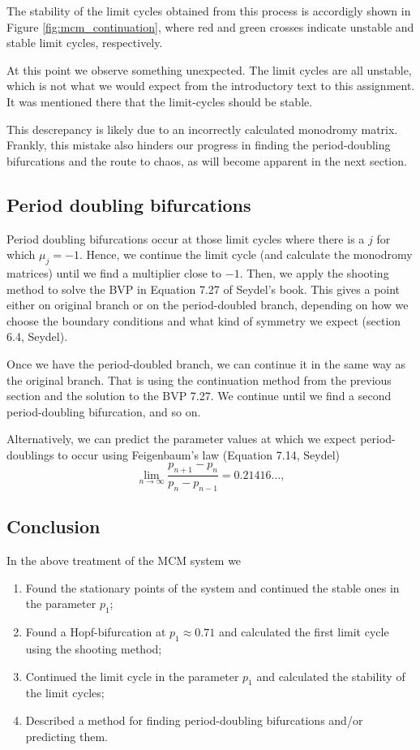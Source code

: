 The stability of the limit cycles obtained from this process is accordigly shown in Figure \ref{fig:mcm_continuation}, where 
red and green crosses indicate unstable and stable limit cycles, respectively. 

At this point we observe something unexpected. The limit cycles are all unstable, which is not what we would expect from the introductory text
to this assignment. It was mentioned there that the limit-cycles should be stable.

This descrepancy is likely due to an incorrectly calculated monodromy matrix. Frankly, this 
mistake also hinders our progress in finding the period-doubling bifurcations and the route to chaos, as will become apparent in the next section.

\subsection{Period doubling bifurcations}
Period doubling bifurcations occur at those limit cycles where there is a $j$ for which $\mu_j = -1$.
Hence, we continue the limit cycle (and calculate the monodromy matrices) until we find a multiplier close to $-1$. Then, we apply the
shooting method to solve the BVP in Equation 7.27 of Seydel's book. This gives a point
either on original branch or on the period-doubled branch, depending on how we choose the boundary conditions
and what kind of symmetry we expect (section 6.4, Seydel). 

Once we have the period-doubled branch, we can continue it in the same way as the original branch. That is using the continuation method
from the previous section and the solution to the BVP 7.27. We continue until
we find a second period-doubling bifurcation, and so on. 

Alternatively, we can predict the parameter values at which we expect period-doublings 
to occur using Feigenbaum's law (Equation 7.14, Seydel)
\[
    \lim_{n \to \infty} \frac{p_{n+1} - p_n}{p_{n} - p_{n-1}} = 0.21416 \dots,
\]

\subsection{Conclusion}
In the above treatment of the MCM system we 
\begin{enumerate}
    \item Found the stationary points of the system and continued the stable ones in the parameter $p_1$;
    \item Found a Hopf-bifurcation at $p_1 \approx 0.71$ and calculated the first limit cycle using the shooting method;
    \item Continued the limit cycle in the parameter $p_1$ and calculated the stability of the limit cycles;
    \item Described a method for finding period-doubling bifurcations and/or predicting them.
\end{enumerate}

